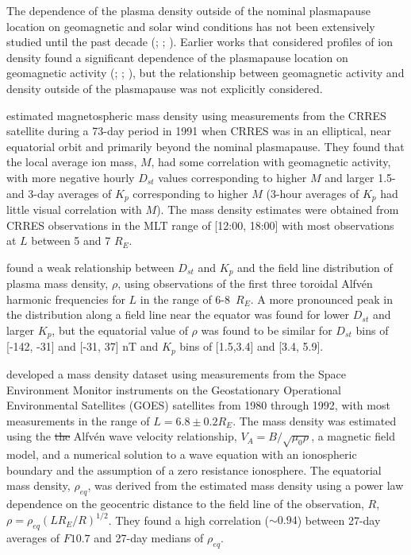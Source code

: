 \documentclass[12pt]{article}
\providecommand{\DIFaddtex}[1]{{\protect\color{blue}\uwave{#1}}} %
\providecommand{\DIFdeltex}[1]{{\protect\color{red}\sout{#1}}}                      %
\providecommand{\DIFaddbegin}{} %
\providecommand{\DIFaddend}{} %
\providecommand{\DIFdelbegin}{} %
\providecommand{\DIFdelend}{} %
\providecommand{\DIFadd}[1]{\texorpdfstring{\DIFaddtex{#1}}{#1}} %
\providecommand{\DIFdel}[1]{\texorpdfstring{\DIFdeltex{#1}}{}} %
\begin{document}
The dependence of the plasma density outside of the nominal plasmapause location on geomagnetic and solar wind conditions has not been extensively studied until the past decade (\cite{Takahashi2006}; \cite{Takahashi2010}; \cite{Denton2016}). Earlier works that considered profiles of ion density found a significant dependence of the plasmapause location on geomagnetic activity (\cite{Chappell1970}; \cite{Maynard1977}; \cite{Carpenter1992}), but the relationship between geomagnetic activity and density outside of the plasmapause was not explicitly considered.

\cite{Takahashi2006} estimated magnetospheric mass density using measurements from the CRRES satellite during a 73-day period in 1991 when CRRES was in an elliptical, near equatorial orbit and primarily beyond the nominal plasmapause. They found that the local average ion mass, $M$, had some correlation with geomagnetic activity, with more negative hourly $D_{st}$ values corresponding to higher $M$ and larger 1.5- and 3-day averages of $K_p$ corresponding to higher $M$ (3-hour averages of $K_p$ had little visual correlation with $M$). The mass density estimates were obtained from CRRES observations in the MLT range of [12:00, 18:00] with most observations at $L$ between 5 and 7 $R_E$.

\cite{Denton2006} found a weak relationship between $D_{st}$ and $K_p$ and the field line distribution of plasma mass density, $\rho$, using observations of the first three toroidal Alfv\'en harmonic frequencies for $L$ in the range of 6-8~$R_E$.  A more pronounced peak in the distribution along a field line near the equator was found for lower $D_{st}$ and larger $K_p$, but the equatorial value of $\rho$ was found to be similar for $D_{st}$ bins of [-142, -31] and [-31, 37] nT and $K_p$ bins of [1.5,3.4] and [3.4, 5.9].

\cite{Takahashi2010} developed a mass density dataset using measurements from the Space Environment Monitor instruments on the Geostationary Operational Environmental Satellites (GOES) satellites from 1980 through 1992, with most measurements in the range of $L=6.8\pm0.2 R_E$. The mass density was estimated using the \DIFdelbegin \DIFdel{the }\DIFdelend Alfv\'en wave velocity relationship, $V_A=B/\sqrt{\mu_0\rho}$, a \DIFaddbegin \DIFadd{storm-time }\DIFaddend magnetic field model, and a numerical solution to a wave equation with an ionospheric boundary and the assumption of a zero resistance ionosphere.  The equatorial mass density, $\rho_{eq}$, was derived from the estimated mass density using a power law dependence on the geocentric distance to the field line of the observation, $R$, $\rho=\rho_{eq}(LR_E/R)^{1/2}$.  They found a high correlation ($\sim 0.94$) between 27-day averages of $F10.7$ and 27-day medians of $\rho_{eq}$.
\end{document}
